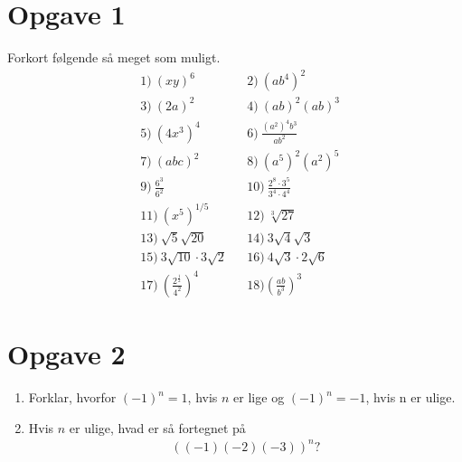 \egroup
\section*{Opgave 1}
Forkort følgende så meget som muligt. 
\begin{align*}
&1)\ (xy)^6   &&2)\ (ab^4)^2     \\
&3)\ (2a)^2   &&4)\  (ab)^2(ab)^3    \\
&5)\  (4x^3)^4             &&6)\ \frac{(a^2)^4b^3}{ab^2}\\
 &7)\ (abc)^2      &&8)\ (a^5)^2(a^2)^5\\
 &9)\ \frac{6^3}{6^2} &&10)\ \frac{2^8\cdot 3^5}{3^4\cdot 4^4}\\
 &11)\  (x^5)^{1/5}            &&12)\ \sqrt[3]{27}\\
 &13)\ \sqrt{5}\sqrt{20}      &&14)\ 3\sqrt{4}\sqrt{3}\\
 &15)\ 3\sqrt{10}\cdot3\sqrt{2} &&16)\ 4\sqrt{3}\cdot2\sqrt{6} \\
&17)\ \left(\frac{2^\frac{1}{2}}{4^2}\right)^4  &&18) \left(\frac{ab}{b^3}\right)^3
\end{align*}

\section*{Opgave 2}
\begin{enumerate}[label=\roman*)]
	\item Forklar, hvorfor $(-1)^n = 1$, hvis $n$ er lige og  $(-1)^n=-1$, hvis n er ulige. 
	\item Hvis $n$ er ulige, hvad er så fortegnet på
	\begin{align*}
		((-1)(-2)(-3))^n?
	\end{align*}
\end{enumerate}

